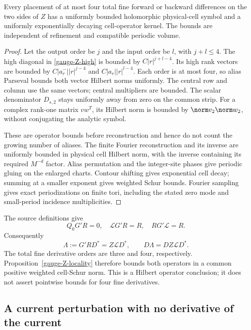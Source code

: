 \begin{proposition}\label{gauge-Z-locality}
Every placement of at most four total fine forward or backward
differences on the two sides of $Z$ has a uniformly bounded
holomorphic physical-cell symbol and a uniformly exponentially
decaying cell-operator kernel. The bounds are independent of
refinement and compatible periodic volume.
\end{proposition}

\begin{proof}
Let the output order be $j$ and the input order be $l$, with
$j+l\le4$. The high diagonal in \eqref{gauge-Z-high} is bounded
by $C|r|^{j+l-4}$. Its high rank vectors are bounded by
$C|a_r^-||r|^{j-4}$ and $C|a_r||r|^{l-4}$.
Each order is at most four, so alias Parseval bounds both vector
Hilbert norms uniformly. The central row and column use the same
vectors; central multipliers are bounded. The scalar denominator
$D_{s,2}$ stays uniformly away from zero on the common strip.
For a complex rank-one matrix $vw^T$, its Hilbert norm is bounded
by $\norm v_2\norm w_2$, without conjugating the analytic symbol.

These are operator bounds before reconstruction and hence do not
count the growing number of aliases. The finite Fourier reconstruction
and its inverse are uniformly bounded in physical cell Hilbert
norm, with the inverse containing its required $M^{-d}$ factor.
Alias permutation and the integer-site phases give periodic gluing
on the enlarged charts. Contour shifting gives exponential cell
decay; summing at a smaller exponent gives weighted Schur bounds.
Fourier sampling gives exact periodizations on finite tori, including
the stated zero mode and small-period incidence multiplicities.
\end{proof}

The source definitions give
\[
 Q_0G'R=0,\quad \mathcal L G'R=R,\quad
 RG'\mathcal L=R.
\]
Consequently
\[
 \Lambda:=G'RD^*=Z\mathcal L D^*,\qquad
 D\Lambda=DZ\mathcal L D^*.
\]
The total fine derivative orders are three and four, respectively.
Proposition~\ref{gauge-Z-locality} therefore bounds both operators
in a common positive weighted cell-Schur norm. This is a Hilbert
operator conclusion; it does not assert pointwise bounds for four
fine derivatives.

\subsection{A current perturbation with no derivative of the current}

